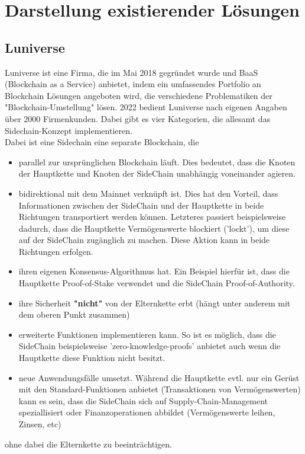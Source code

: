 \chapter{Darstellung existierender Lösungen}
\label{cha:existierende Lösungen}

\section{Luniverse}
Luniverse \cite{ID27} ist eine Firma, die im Mai 2018 gegründet wurde und BaaS (Blockchain as a Service) anbietet, indem ein umfassendes Portfolio an Blockchain Lösungen angeboten wird, die verschiedene Problematiken der "Blockchain-Umstellung" lösen. 2022 bedient Luniverse nach eigenen Angaben über 2000 Firmenkunden. Dabei gibt es vier Kategorien, die allesamt das Sidechain-Konzept implementieren. \\
Dabei ist eine Sidechain \cite{ID29} \cite{ID33} eine separate Blockchain, die 
\begin{itemize}
	\item parallel zur ursprünglichen Blockchain läuft. Dies bedeutet, dass die Knoten der Hauptkette und Knoten der SideChain unabhängig voneinander agieren.
	\item bidirektional mit dem Mainnet verknüpft ist. Dies hat den Vorteil, dass Informationen zwischen der SideChain und der Hauptkette in beide Richtungen transportiert werden können. Letzteres passiert beispielsweise dadurch, dass die Hauptkette Vermögenswerte blockiert ('lockt'), um diese auf der SideChain zugänglich zu machen. Diese Aktion kann in beide Richtungen erfolgen.
	
	\item ihren eigenen Konsensus-Algorithmus hat. Ein Beispiel hierfür ist, dass die Hauptkette Proof-of-Stake verwendet und die SideChain Proof-of-Authority.
	\item ihre Sicherheit \textbf{"nicht"} von der Elternkette erbt (hängt unter anderem mit dem oberen Punkt zusammen)
	\item erweiterte Funktionen implementieren kann. So ist es möglich, dass die SideChain beispielsweise 'zero-knowledge-proofs' anbietet auch wenn die Hauptkette diese Funktion nicht besitzt.
	\item neue Anwendungsfälle umsetzt. Während die Hauptkette evtl. nur ein Gerüst mit den Standard-Funktionen anbietet (Transaktionen von Vermögenswerten) kann es sein, dass die SideChain sich auf Supply-Chain-Management speziallisiert oder Finanzoperationen abbildet (Vermögenswerte leihen, Zinsen, etc)
\end{itemize}
ohne dabei die Elternkette zu beeinträchtigen.

